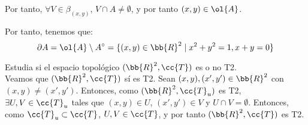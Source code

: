 \documentclass[12pt]{article}
\newcommand{\T}[0]{\cc{T}}
\begin{document}
\begin{ejercicio}
\begin{enumerate}
\begin{description}
                Por tanto, $\forall V\in \beta_{(x,y)}$, $V\cap A\neq \emptyset$, y por tanto $(x,y)\in \ol{A}$.
            \end{description}

            Por tanto, tenemos que:
            \begin{equation*}
                \partial A = \ol{A}\setminus A^\circ = \{(x,y)\in \bb{R}^2\mid x^2+y^2=1, x+y=0\}
            \end{equation*}
        \end{enumerate}
    \end{ejercicio}

    \begin{ejercicio}[1 punto]
        Estudia si el espacio topológico $(\bb{R}^2,\T)$ es o no T2.\\

        Veamos que $(\bb{R}^2,\T)$ sí es T2. Sean $(x,y), (x',y')\in \bb{R}^2$ con $(x,y)\neq (x',y')$. Entonces, como $(\bb{R}^2,\T_u)$ es T2,
        $\exists U,V\in \T_u$ tales que $(x,y)\in U$, $(x',y')\in V$ y $U\cap V=\emptyset$. Entonces, como $\T_u\subset \T$, $U,V\in \T$, y por tanto
        $(\bb{R}^2,\T)$ es T2.
    \end{ejercicio}
\end{document}
